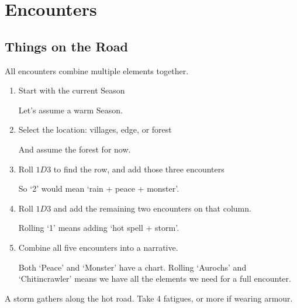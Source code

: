\chapter[Encounters at the Crossroads]{Encounters}

\section{Things on the Road}

\begin{multicols}{2}

All encounters combine multiple elements together.

\begin{enumerate}
  \item
  Start with the current Season

  \begin{exampletext}
    Let's assume a warm Season.
  \end{exampletext}
  \item
  Select the location: villages, edge, or forest

  \begin{exampletext}
    And assume the forest for now.
  \end{exampletext}
  \item
  Roll $1D3$ to find the row, and add those three encounters

  \begin{exampletext}
    So `2' would mean `rain + peace + monster'.
  \end{exampletext}

  \item
  Roll $1D3$ and add the remaining two encounters on that column.

  \begin{exampletext}
    Rolling `1' means adding `hot spell + storm'.
  \end{exampletext}

  \item
  Combine all five encounters into a narrative.

  \begin{exampletext}
    Both `Peace' and `Monster' have a chart.
    Rolling `Aurochs' and `Chitincrawler' means we have all the elements we need for a full encounter.
  \end{exampletext}

\end{enumerate}

\begin{exampletext}
  \begin{speechtext}
    A storm gathers along the hot road.
    Take 4 \glspl{fatigue}, or more if wearing armour.


\end{speechtext}
\end{exampletext}
\end{multicols}
